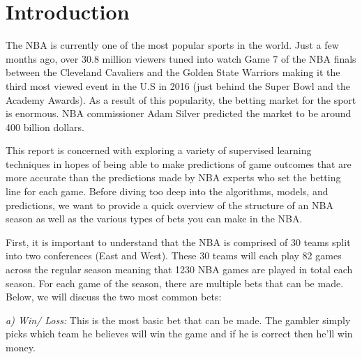 \documentclass{article}
\begin{document}


\section{Introduction}
The NBA is currently one of the most popular sports in the world. Just a few months ago, over 30.8 million viewers tuned into watch Game 7 of the NBA finals between the Cleveland Cavaliers and the Golden State Warriors making it the third most viewed event in the U.S in 2016 (just behind the Super Bowl and the Academy Awards). As a result of this popularity, the betting market for the sport is enormous. NBA commissioner Adam Silver predicted the market to be around 400 billion dollars.

This report is concerned with exploring a variety of supervised learning techniques in hopes of being able to make predictions of game outcomes that are more accurate than the predictions made by NBA experts who set the betting line for each game. Before diving too deep into the algorithms, models, and predictions, we want to provide a quick overview of the structure of an NBA season as well as the various types of bets you can make in the NBA.

First, it is important to understand that the NBA is comprised of 30 teams split into two conferences (East and West). These 30 teams will each play 82 games across the regular season meaning that 1230 NBA games are played in total each season. For each game of the season, there are multiple bets that can be made. Below, we will discuss the two most common bets:

\textit{a) Win/ Loss:} This is the most basic bet that can be made. The gambler simply picks which team he believes will win the game and if he is correct then he'll win money.
\end{document}
